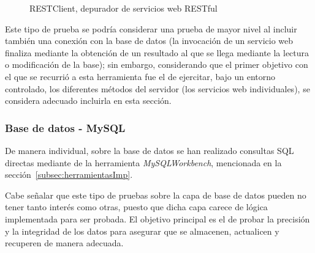 \begin{figure}
	\centering
	\caption{RESTClient, depurador de servicios web RESTful}
	\label{fig:RESTClient}
\end{figure}

Este tipo de prueba se podría considerar una prueba de mayor nivel al incluir también una conexión con la base de datos (la invocación de un servicio web finaliza mediante la obtención de un resultado al que se llega mediante la lectura o modificación de la base); sin embargo, considerando que el primer objetivo con el que se recurrió a esta herramienta fue el de ejercitar, bajo un entorno controlado, los diferentes métodos del servidor (los servicios web individuales), se considera adecuado incluirla en esta sección.

\subsubsection{Base de datos - MySQL}

De manera individual, sobre la base de datos se han realizado consultas SQL directas mediante de la herramienta \emph{MySQLWorkbench}, mencionada en la sección~\ref{subsec:herramientasImp}. 

Cabe señalar que este tipo de pruebas sobre la capa de base de datos pueden no tener tanto interés como otras, puesto que dicha capa carece de lógica implementada para ser probada. El objetivo principal es el de probar la precisión y la integridad de los datos para asegurar que se almacenen, actualicen y recuperen de manera adecuada.

